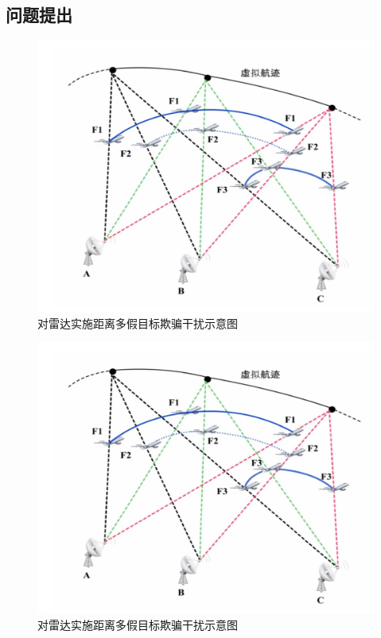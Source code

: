 \documentclass[bwprint]{gmcmthesis}
\numberwithin{figure}{section}
\begin{document}
\subsection{问题提出}


\begin{figure}[!h]
\centering
\includegraphics[width=.7\textwidth]{test.jpg}
\caption{对雷达实施距离多假目标欺骗干扰示意图}
\label{fig1}
\end{figure}
\begin{figure}[!h]
\centering
\includegraphics[width=.7\textwidth]{test.jpg}
\caption{对雷达实施距离多假目标欺骗干扰示意图}
\label{fig1}
\end{figure}
\end{document}
